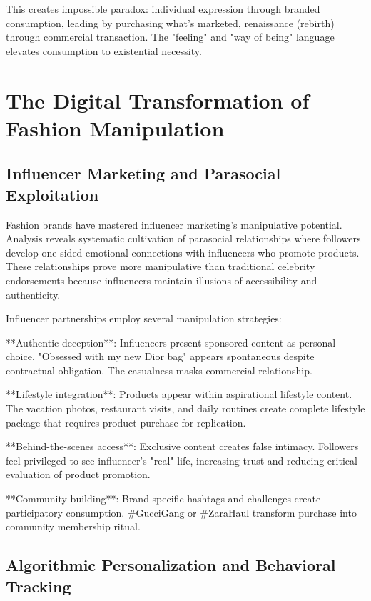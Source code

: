 This creates impossible paradox: individual expression through branded consumption, leading by purchasing what's marketed, renaissance (rebirth) through commercial transaction. The "feeling" and "way of being" language elevates consumption to existential necessity.

\section{The Digital Transformation of Fashion Manipulation}
\label{sec:fashion_digital}

\subsection{Influencer Marketing and Parasocial Exploitation}

Fashion brands have mastered influencer marketing's manipulative potential. Analysis reveals systematic cultivation of parasocial relationships where followers develop one-sided emotional connections with influencers who promote products. These relationships prove more manipulative than traditional celebrity endorsements because influencers maintain illusions of accessibility and authenticity.

Influencer partnerships employ several manipulation strategies:

**Authentic deception**: Influencers present sponsored content as personal choice. "Obsessed with my new Dior bag" appears spontaneous despite contractual obligation. The casualness masks commercial relationship.

**Lifestyle integration**: Products appear within aspirational lifestyle content. The vacation photos, restaurant visits, and daily routines create complete lifestyle package that requires product purchase for replication.

**Behind-the-scenes access**: Exclusive content creates false intimacy. Followers feel privileged to see influencer's "real" life, increasing trust and reducing critical evaluation of product promotion.

**Community building**: Brand-specific hashtags and challenges create participatory consumption. #GucciGang or #ZaraHaul transform purchase into community membership ritual.

\subsection{Algorithmic Personalization and Behavioral Tracking}

